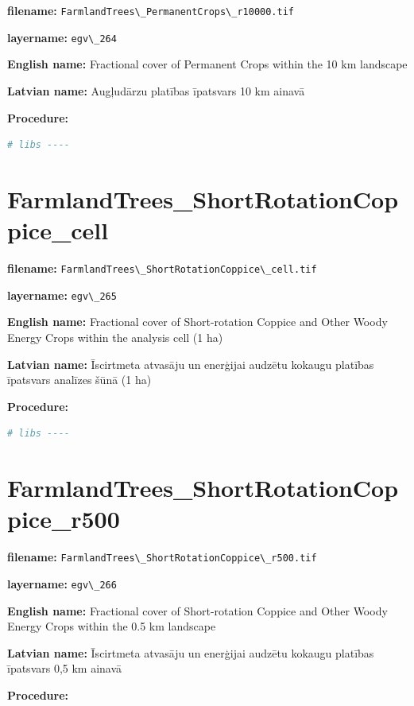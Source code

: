 \documentclass[
]{book}
\newcommand{\passthrough}[1]{#1}
\begin{document}
\textbf{filename:} \passthrough{\lstinline!FarmlandTrees\_PermanentCrops\_r10000.tif!}

\textbf{layername:} \passthrough{\lstinline!egv\_264!}

\textbf{English name:} Fractional cover of Permanent Crops within the 10 km landscape

\textbf{Latvian name:} Augļudārzu platības īpatsvars 10 km ainavā

\textbf{Procedure:}

\begin{lstlisting}[language=R]
# libs ----
\end{lstlisting}

\section{FarmlandTrees\_ShortRotationCoppice\_cell}\label{ch06.265}

\textbf{filename:} \passthrough{\lstinline!FarmlandTrees\_ShortRotationCoppice\_cell.tif!}

\textbf{layername:} \passthrough{\lstinline!egv\_265!}

\textbf{English name:} Fractional cover of Short-rotation Coppice and Other Woody Energy Crops within the analysis cell (1 ha)

\textbf{Latvian name:} Īscirtmeta atvasāju un enerģijai audzētu kokaugu platības īpatsvars analīzes šūnā (1 ha)

\textbf{Procedure:}

\begin{lstlisting}[language=R]
# libs ----
\end{lstlisting}

\section{FarmlandTrees\_ShortRotationCoppice\_r500}\label{ch06.266}

\textbf{filename:} \passthrough{\lstinline!FarmlandTrees\_ShortRotationCoppice\_r500.tif!}

\textbf{layername:} \passthrough{\lstinline!egv\_266!}

\textbf{English name:} Fractional cover of Short-rotation Coppice and Other Woody Energy Crops within the 0.5 km landscape

\textbf{Latvian name:} Īscirtmeta atvasāju un enerģijai audzētu kokaugu platības īpatsvars 0,5 km ainavā

\textbf{Procedure:}
\end{document}

